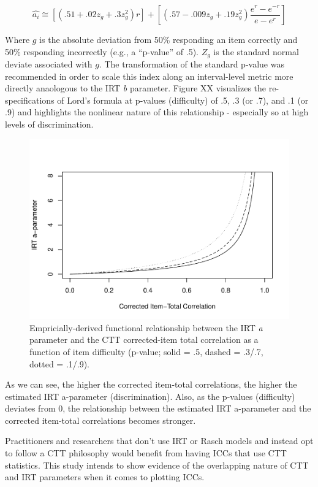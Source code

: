 \documentclass[
  english,
  man]{apa6}
\begin{document}
\[\hat{a_i}\cong[(.51 + .02z_g + .3z_g^2)r]+[(.57 - .009z_g + .19z_g^2)\frac{e^r-e^{-r}}{e-e^r}]\]

Where \(g\) is the absolute deviation from 50\% responding an item correctly and 50\% responding incorrectly (e.g., a ``p-value'' of .5). \(Z_g\) is the standard normal deviate associated with \(g\). The transformation of the standard p-value was recommended in order to scale this index along an interval-level metric more directly anaologous to the IRT \emph{b} parameter. Figure XX visualizes the re-specifications of Lord's formula at p-values (difficulty) of .5, .3 (or .7), and .1 (or .9) and highlights the nonlinear nature of this relationship - especially so at high levels of discrimination.

\begin{figure}
\centering
\includegraphics{ICC_project_files/figure-latex/acorrected-1.pdf}
\caption{\label{fig:acorrected}Empricially-derived functional relationship between the IRT \emph{a} parameter and the CTT corrected-item total correlation as a function of item difficulty (p-value; solid = .5, dashed = .3/.7, dotted = .1/.9).}
\end{figure}

As we can see, the higher the corrected item-total correlations, the higher the estimated IRT a-parameter (discrimination). Also, as the p-values (difficulty) deviates from 0, the relationship between the estimated IRT a-parameter and the corrected item-total correlations becomes stronger.

Practitioners and researchers that don't use IRT or Rasch models and instead opt to follow a CTT philosophy would benefit from having ICCs that use CTT statistics. This study intends to show evidence of the overlapping nature of CTT and IRT parameters when it comes to plotting ICCs.
\end{document}
